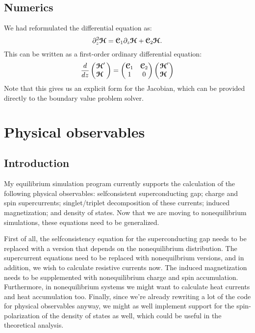 \clearpage
\section{Numerics}
We had reformulated the differential equation as:
\begin{equation}
  \partial_z^2\bm{\mathcal{H}} = \bm{\mathcal{C}}_1 \partial_z \bm{\mathcal{H}} + \bm{\mathcal{C}}_2 \bm{\mathcal{H}}.
\end{equation}
This can be written as a first-order ordinary differential equation:
\begin{equation}
  \frac{d}{dz}
  \begin{pmatrix}
    \!\phantom{'}\bm{\mathcal{H}}'\, \\
    \!\bm{\mathcal{H}}\,
  \end{pmatrix}
  = 
  \begin{pmatrix}
    \bm{\mathcal{C}}_1 & \bm{\mathcal{C}}_2 \\
    1        & 0
  \end{pmatrix}
  \begin{pmatrix}
    \!\phantom{'}\bm{\mathcal{H}}' \\
    \!\bm{\mathcal{H}}
  \end{pmatrix}
\end{equation}
Note that this gives us an explicit form for the Jacobian, which can be provided directly to the boundary value problem solver.




\clearpage
\chapter{Physical observables}
\section{Introduction}
My equilibrium simulation program currently supports the calculation of the following physical observables:
  selfconsistent superconducting gap;
  charge and spin supercurrents;
  singlet/triplet decomposition of these currents;
  induced magnetization;
  and density of states.
Now that we are moving to nonequilibrium simulations, these equations need to be generalized.

First of all, the selfconsistency equation for the superconducting gap needs to be replaced with a version that depends on the nonequilibrium distribution.
The supercurrent equations need to be replaced with nonequilbrium versions, and in addition, we wish to calculate resistive currents now.
The induced magnetization needs to be supplemented with nonequilibrium charge and spin accumulation.
Furthermore, in nonequilibrium systems we might want to calculate heat currents and heat accumulation too.
Finally, since we're already rewriting a lot of the code for physical observables anyway, we might as well implement support for the spin-polarization of the density of states as well, which could be useful in the theoretical analysis.

